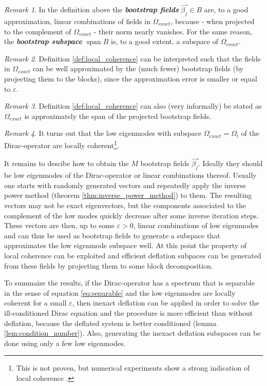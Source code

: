 \documentclass{article}
\DeclareMathOperator{\spn}{span} %
\theoremstyle{plain} %
\theoremstyle{convention} %
\theoremstyle{remark} %
\newtheorem*{remark}{Remark} %
\def\df#1{\textbf{\textit{#1}}}
\numberwithin{equation}{section}
\begin{document}
\begin{remark}
In the definition above the \df{bootstrap fields} $\vec{\beta_j} \in B$ are, to a good approximation, linear combinations of fields in $\Omega_{exact}$, because - when projected to the complement of $\Omega_{exact}$ - their norm nearly vanishes. For the same reason, the \df{bootstrap subspace} $\spn{B}$ is, to a good extent, a subspace of $\Omega_{exact}$.
\end{remark}

\begin{remark}
Definition \ref{def:local_coherence} can be interpreted such that the fields in $\Omega_{exact}$ can be well approximated by the (much fewer) bootstrap fields (by projecting them to the blocks), since the approximation error is smaller or equal to $\varepsilon$.
\end{remark}

\begin{remark}
Definition \ref{def:local_coherence} can also (very informally) be stated as $\Omega_{exact}$ is approximately the span of the projected bootstrap fields.
\end{remark}

\begin{remark}
It turns out that the low eigenmodes with subspace $\Omega_{exact} = \Omega_l$ of the Dirac-operator are locally coherent\footnote{This is not proven, but numerical experiments show a strong indication of local coherence \cite{luscher2007}.}.
\end{remark}

It remains to descibe how to obtain the $M$ bootstrap fields $\vec{\beta_j}$. Ideally they should be low eigenmodes of the Dirac-operator or linear combinations thereof. Usually one starts with randomly generated vectors and repeatedly apply the inverse power method (theorem \ref{thm:inverse_power_method}) to them. The resulting vectors may not be exact eigenvectors, but the components associated to the complement of the low modes quickly decrease after some inverse iteration steps. These vectors are then, up to some $\varepsilon > 0$, linear combinations of low eigenmodes and can thus be used as bootstrap fields to generate a subspace that approximates the low eigenmode subspace well. At this point the property of local coherence can be exploited and efficient deflation subpaces can be generated from these fields by projecting them to some block decomposition.

To summaize the results, if the Dirac-operator has a spectrum that is separable in the sense of equation \eqref{eq:separable} and the low eigenmodes are locally coherent for a small $\varepsilon$, then inexact deflation can be applied in order to solve the ill-conditioned Dirac equation and the procedure is more efficient than without deflation, because the deflated system is better conditioned (lemma \ref{lem:condition_number}). Also, generating the inexact deflation subspaces can be done using only a few low eigenmodes.
\end{document}
